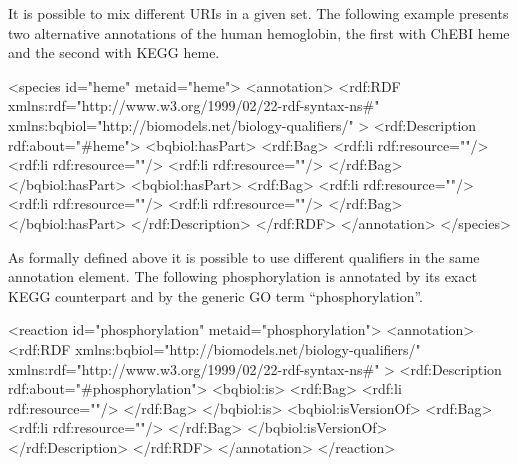 It is possible to mix different URIs in a given set. The
following example presents two alternative annotations of the human
hemoglobin, the first with ChEBI heme and the second with KEGG
heme.

\begin{example}
<species id="heme" metaid="heme">
  <annotation>
    <rdf:RDF
      xmlns:rdf="http://www.w3.org/1999/02/22-rdf-syntax-ns\#"
      xmlns:bqbiol="http://biomodels.net/biology-qualifiers/"
    >
     <rdf:Description rdf:about="\#heme">
       <bqbiol:hasPart>
         <rdf:Bag>
           <rdf:li rdf:resource="\!"/>
           <rdf:li rdf:resource="\!"/>
           <rdf:li rdf:resource="\!"/>
         </rdf:Bag>
       </bqbiol:hasPart>
       <bqbiol:hasPart>
         <rdf:Bag>
          <rdf:li rdf:resource="\!"/>
           <rdf:li rdf:resource="\!"/>
           <rdf:li rdf:resource="\!"/>
         </rdf:Bag>
       </bqbiol:hasPart>
     </rdf:Description>
   </rdf:RDF>
  </annotation>
</species>
\end{example}

As formally defined above it is possible to use different
qualifiers in the same annotation element. The following
phosphorylation is annotated by its exact KEGG counterpart and by
the generic GO term ``phosphorylation''.

\begin{example}
<reaction id="phosphorylation" metaid="phosphorylation">
  <annotation>
    <rdf:RDF
      xmlns:bqbiol="http://biomodels.net/biology-qualifiers/"
      xmlns:rdf="http://www.w3.org/1999/02/22-rdf-syntax-ns\#"
    >
      <rdf:Description rdf:about="\#phosphorylation">
        <bqbiol:is>
          <rdf:Bag>
            <rdf:li rdf:resource="\!"/>
          </rdf:Bag>
        </bqbiol:is>
        <bqbiol:isVersionOf>
          <rdf:Bag>
            <rdf:li rdf:resource="\!"/>
          </rdf:Bag>
        </bqbiol:isVersionOf>
      </rdf:Description>
    </rdf:RDF>
  </annotation>
</reaction>
\end{example}

